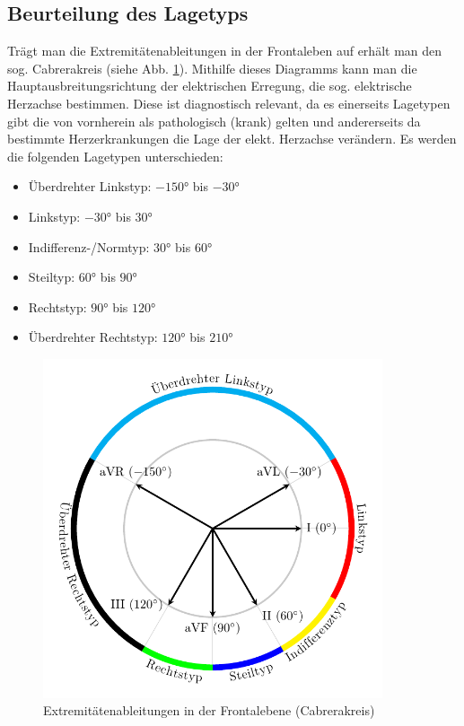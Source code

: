 \subsection{Beurteilung des Lagetyps} \label{01:Lagetyp}


Trägt man die Extremitätenableitungen in der Frontaleben auf erhält man den sog. Cabrerakreis (siehe Abb. \ref{01:Cabrerakreis}). Mithilfe dieses Diagramms kann man die Hauptausbreitungsrichtung der elektrischen Erregung, die sog. elektrische Herzachse bestimmen. Diese ist diagnostisch relevant, da es einerseits Lagetypen gibt die von vornherein als pathologisch (krank) gelten und andererseits da bestimmte Herzerkrankungen die Lage der elekt. Herzachse verändern. Es werden die folgenden Lagetypen unterschieden:
\begin{itemize}
	\item Überdrehter Linkstyp: $\ang{-150}$ bis $\ang{-30}$
	\item Linkstyp: $\ang{-30}$ bis $\ang{30}$
	\item Indifferenz-/Normtyp: $\ang{30}$ bis $\ang{60}$
	\item Steiltyp: $\ang{60}$ bis $\ang{90}$
	\item Rechtstyp: $\ang{90}$ bis $\ang{120}$
	\item Überdrehter Rechtstyp: $\ang{120}$ bis $\ang{210}$
\end{itemize}



\begin{figure}[H]
	\centering
	\includegraphics[width=10cm]{./img/Cabrerakreis}
	\caption{Extremitätenableitungen in der Frontalebene (Cabrerakreis)}\label{01:Cabrerakreis}
\end{figure}

